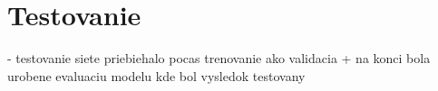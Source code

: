 
\section{Testovanie}
\label{sec:testovanie}
- testovanie siete priebiehalo pocas trenovanie ako validacia
  + na konci bola urobene evaluaciu modelu kde bol vysledok testovany
